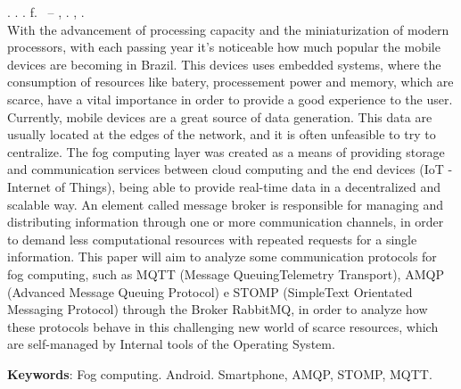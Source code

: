 
\begin{resumo}[ABSTRACT]
\begin{SingleSpacing}

\imprimirautorcitacao. \imprimirtitleabstract. \imprimirdata. \pageref {LastPage} f. \imprimirprojeto\ – \imprimirprograma, \imprimirinstituicao. \imprimirlocal, \imprimirdata.\\

With the advancement of processing capacity and the miniaturization of modern processors, with each passing year it's noticeable how much popular the mobile devices are becoming in Brazil. This devices uses embedded systems, where the consumption of resources like batery, processement power and memory, which are scarce, have a vital importance in order to provide a good experience to the user. Currently, mobile devices are a great source of data generation. This data are usually located at the edges of the network, and it is often unfeasible to try to centralize. The fog computing layer was created as a means of providing storage and communication services between cloud computing and the end devices (IoT - Internet of Things), being able to provide real-time data in a decentralized and scalable way. An element called message broker is responsible for managing and distributing information through one or more communication channels, in order to demand less computational resources with repeated requests for a single information. This paper will aim to analyze some communication protocols for fog computing, such as MQTT (Message QueuingTelemetry Transport), AMQP (Advanced Message Queuing Protocol) e STOMP (SimpleText Orientated Messaging Protocol) through the Broker RabbitMQ, in order to analyze how these protocols behave in this challenging new world of scarce resources, which are self-managed by Internal tools of the Operating System.\par

\textbf{Keywords}: Fog computing. Android. Smartphone, AMQP, STOMP, MQTT. 

\end{SingleSpacing}
\end{resumo}


